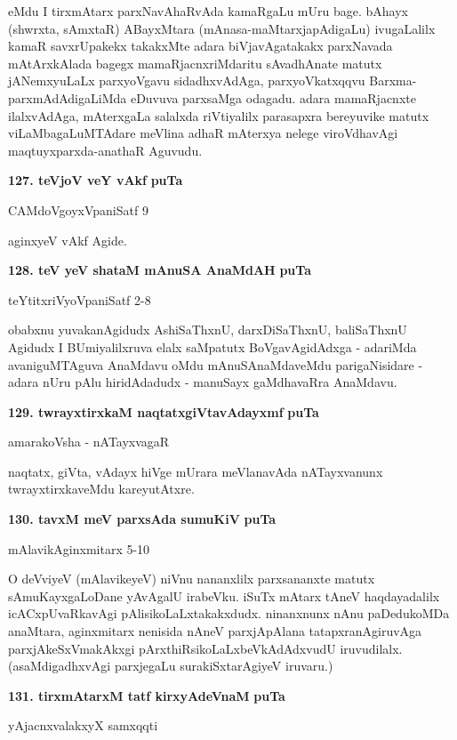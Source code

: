 eMdu I tirxmAtarx parxNavAhaRvAda kamaRgaLu mUru bage. bAhayx (shwrxta, sAmxtaR) ABayxMtara (mAnasa-maMtarxjapAdigaLu) ivugaLalilx kamaR savxrUpakekx takakxMte adara biVjavAgatakakx parxNavada mAtArxkAlada bagegx mamaRjacnxriMdaritu sAvadhAnate matutx jANemxyuLaLx parxyoVgavu sidadhxvAdAga, parxyoVkatxqqvu Barxma-parxmAdAdigaLiMda eDuvuva parxsaMga odagadu. adara mamaRjacnxte ilalxvAdAga, mAterxgaLa salalxda riVtiyalilx parasapxra bereyuvike matutx viLaMbagaLuMTAdare meVlina adhaR mAterxya nelege viroVdhavAgi maqtuyxparxda-anathaR Aguvudu.

\medskip
\noindent
\textbf{127. teVjoV veY vAkf} \hfill{\bf puTa }

\hfill{CAMdoVgoyxVpaniSatf 9}

aginxyeV vAkf Agide.

\medskip
\noindent
\textbf{128. teV yeV shataM mAnuSA AnaMdAH} \hfill{\bf puTa }

\hfill{teYtitxriVyoVpaniSatf 2-8}

obabxnu yuvakanAgidudx AshiSaThxnU, darxDiSaThxnU, baliSaThxnU Agidudx I BUmiyalilxruva elalx saMpatutx BoVgavAgidAdxga - adariMda avaniguMTAguva AnaMdavu oMdu mAnuSAnaMdaveMdu parigaNisidare - adara nUru pAlu hiridAdadudx - manuSayx gaMdhavaRra AnaMdavu.

\eject

\noindent
\textbf{129. twrayxtirxkaM naqtatxgiVtavAdayxmf} \hfill{\bf puTa }

\hfill{amarakoVsha - nATayxvagaR}

\smallskip
naqtatx, giVta, vAdayx hiVge mUrara meVlanavAda nATayxvanunx twrayxtirxkaveMdu kareyutAtxre.

\medskip
\noindent
\textbf{130. tavxM meV parxsAda sumuKiV} \hfill{\bf puTa }

\hfill{mAlavikAginxmitarx 5-10}

\smallskip
O deVviyeV (mAlavikeyeV) niVnu nananxlilx parxsananxte matutx sAmuKayxgaLoDane yAvAgalU irabeVku. iSuTx mAtarx tAneV haqdayadalilx icACxpUvaRkavAgi pAlisikoLaLxtakakxdudx. ninanxnunx nAnu paDedukoMDa anaMtara, aginxmitarx nenisida nAneV parxjApAlana tatapxranAgiruvAga parxjAkeSxVmakAkxgi pArxthiRsikoLaLxbeVkAdAdxvudU iruvudilalx. (asaMdigadhxvAgi parxjegaLu surakiSxtarAgiyeV iruvaru.)

\medskip
\noindent
\textbf{131. tirxmAtarxM tatf kirxyAdeVnaM} \hfill{\bf puTa }

\hfill{yAjacnxvalakxyX samxqqti}

